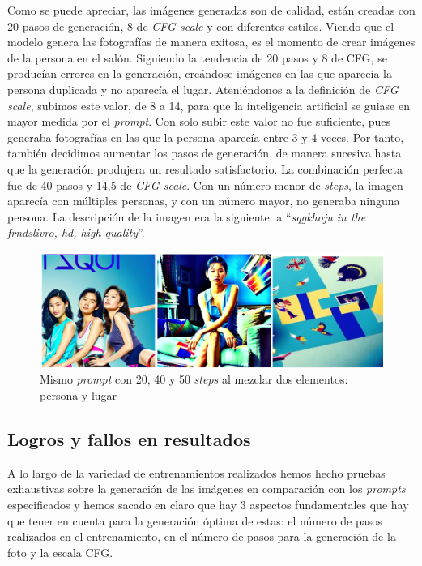 Como se puede apreciar, las imágenes generadas son de calidad, están creadas con 20 pasos de generación, 8 de \textit{CFG scale} y con diferentes estilos. Viendo que el modelo genera las fotografías de manera exitosa, es el momento de crear imágenes de la persona en el salón. Siguiendo la tendencia de 20 pasos y 8 de CFG, se producían errores en la generación, creándose imágenes en las que aparecía la persona duplicada y no aparecía el lugar. Ateniéndonos a la definición de \textit{CFG scale}, subimos este valor, de 8 a 14, para que la inteligencia artificial se guiase en mayor medida por el \textit{prompt}. Con solo subir este valor no fue suficiente, pues generaba fotografías en las que la persona aparecía entre 3 y 4 veces. Por tanto, también decidimos aumentar los pasos de generación, de manera sucesiva hasta que la generación produjera un resultado satisfactorio. La combinación perfecta fue de 40 pasos y 14,5 de \textit{CFG scale}. Con un número menor de \textit{steps}, la imagen aparecía con múltiples personas, y con un número mayor, no generaba ninguna persona. La descripción de la imagen era la siguiente: a ``\textit{sqgkhoju in the frndslivro, hd, high quality}''.\\

\begin{figure}[!htb]
	\centering
	\includegraphics[width = 1
	\textwidth]{Imagenes/Vectorial/resultadoshojuyfrnds.png}
	\caption{Mismo \textit{prompt} con 20, 40 y 50 \textit{steps} al mezclar dos elementos: persona y lugar}
	\label{fig:comphachi}
\end{figure}


\subsection{Logros y fallos en resultados}

A lo largo de la variedad de entrenamientos realizados hemos hecho pruebas exhaustivas sobre la generación de las imágenes en comparación con los \textit{prompts} especificados y hemos sacado en claro que hay 3 aspectos fundamentales que hay que tener en cuenta para la generación óptima de estas: el número de pasos realizados en el entrenamiento, en el número de pasos para la generación de la foto y la escala CFG. 

